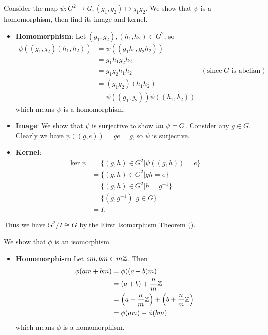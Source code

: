 \begin{questions}
\begin{partquestions}{\alph*}
        \item Consider the map $\psi: G^2 \to G, (g_1, g_2) \mapsto g_1g_2$. We show that $\psi$ is a homomorphism, then find its image and kernel.
        \begin{itemize}
            \item \textbf{Homomorphism}: Let $(g_1, g_2), (h_1, h_2) \in G^2$, so
            \begin{align*}
                \psi((g_1, g_2)(h_1, h_2)) &= \psi((g_1h_1, g_2h_2))\\
                &= g_1h_1g_2h_2\\
                &= g_1g_2h_1h_2 & (\text{since } G \text{ is abelian})\\
                &= (g_1g_2)(h_1h_2)\\
                &= \psi((g_1, g_2))\psi((h_1, h_2))
            \end{align*}
            which means $\psi$ is a homomorphism.

            \item \textbf{Image}: We show that $\psi$ is surjective to show $\mathrm{im}\; \psi = G$. Consider any $g \in G$. Clearly we have $\psi((g, e)) = ge = g$, so $\psi$ is surjective.

            \item \textbf{Kernel}:
            \begin{align*}
                \ker\psi &= \{(g, h) \in G^2 \vert \psi((g, h)) = e\}\\
                &= \{(g, h) \in G^2 \vert gh = e\}\\
                &= \{(g, h) \in G^2 \vert h = g^{-1}\}\\
                &= \{(g, g^{-1}) \ | g \in G\}\\
                &= I.
            \end{align*}
        \end{itemize}

        Thus we have $G^2 / I \cong G$ by the First Isomorphism Theorem ().
    \end{partquestions}

    \item We show that $\phi$ is an isomorphism.
    \begin{itemize}
        \item \textbf{Homomorphism} Let $am, bm \in m\mathbb{Z}$. Then
        \begin{align*}
            \phi(am + bm) &= \phi((a+b)m)\\
            &= (a+b) + \frac nm \mathbb{Z}\\
            &= \left(a + \frac nm \mathbb{Z}\right) + \left(b + \frac nm \mathbb{Z}\right)\\
            &= \phi(am) + \phi(bm)
        \end{align*}
        which means $\phi$ is a homomorphism.


\end{itemize}
\end{questions}

